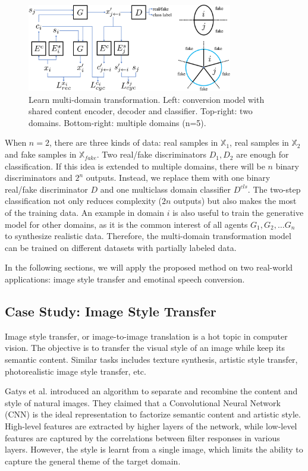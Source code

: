 \documentclass{article}
\begin{document}
\begin{figure}[htb]
\center
\includegraphics[width=0.8\textwidth]{FIG/multi}
\caption{Learn multi-domain transformation. Left: conversion model with shared content encoder, decoder and classifier. Top-right: two domains. Bottom-right: multiple domains (n=5).}
\label{fig:multi}
\end{figure}

When $n=2$, there are three kinds of data: real samples in $\mathbb{X}_1$, real samples in $\mathbb{X}_2$ and fake samples in $\mathbb{X}_{fake}$. Two real/fake discriminators $D_1,D_2$ are enough for classification.
If this idea is extended to multiple domains, there will be $n$ binary discriminators and $2^n$ outputs. Instead, we replace them with one binary real/fake discriminator $D$ and one multiclass domain classifier $D^{cls}$. The two-step classification not only reduces complexity ($2n$ outputs) but also makes the most of the training data. An example in domain $i$ is also useful to train the generative model for other domains, as it is the common interest of all agents $G_1, G_2, \ldots G_n$ to synthesize realistic data. Therefore, the multi-domain transformation model can be trained on different datasets with partially labeled data.

In the following sections, we will apply the proposed method on two real-world applications: image style transfer and emotinal speech conversion.


\subsection{Case Study: Image Style Transfer}
Image style transfer, or image-to-image translation is a hot topic in computer vision. The objective is to transfer the visual style of an image while keep its semantic content. Similar tasks includes texture synthesis, artistic style transfer, photorealistic image style transfer, etc.

Gatys et al. \cite{gatys2016image} introduced an algorithm to separate and recombine the content and style of natural images. They claimed that a Convolutional Neural Network (CNN) is the ideal representation to factorize semantic content and artistic style. High-level features are extracted by higher layers of the network, while low-level features are captured by the correlations between filter responses in various layers. However, the style is learnt from a single image, which limits the ability to capture the general theme of the target domain.
\end{document}
